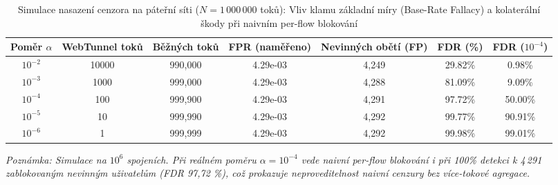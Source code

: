 \begin{table}[htbp]
\centering
\caption{Simulace nasazení cenzora na páteřní síti ($N = 1\,000\,000$ toků): Vliv klamu základní míry (Base-Rate Fallacy) a kolaterální škody při naivním per-flow blokování}
\label{tab:censor_simulation}
\begin{tabular}{ccccccc}
\hline
\textbf{Poměr $\alpha$} & \textbf{WebTunnel toků} & \textbf{Běžných toků} & \textbf{FPR (naměřeno)} & \textbf{Nevinných obětí (FP)} & \textbf{FDR (\%)} & \textbf{FDR ($10^{-4}$)} \\
\hline
$10^{-2}$ & 10000 & 990,000 & 4.29e-03 & 4,249 & 29.82\% & 0.98\% \\
$10^{-3}$ & 1000 & 999,000 & 4.29e-03 & 4,288 & 81.09\% & 9.09\% \\
$10^{-4}$ & 100 & 999,900 & 4.29e-03 & 4,291 & 97.72\% & 50.00\% \\
$10^{-5}$ & 10 & 999,990 & 4.29e-03 & 4,292 & 99.77\% & 90.91\% \\
$10^{-6}$ & 1 & 999,999 & 4.29e-03 & 4,292 & 99.98\% & 99.01\% \\
\hline
\end{tabular}
\par\vspace{0.15cm}\footnotesize\textit{Poznámka: Simulace na $10^6$ spojeních. Při reálném poměru $\alpha = 10^{-4}$ vede naivní per-flow blokování i při 100\% detekci k 4\,291 zablokovaným nevinným uživatelům (FDR 97,72 \%), což prokazuje neproveditelnost naivní cenzury bez více-tokové agregace.}
\end{table}

